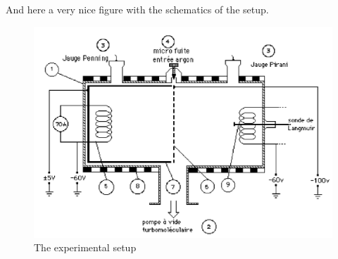 And here a very nice figure with the schematics of the setup.
\begin{figure}
    \centering
    \includegraphics[width=12cm]{figures/experimental-setup.png}
    \caption{The experimental setup}
    \label{fig:experimental_setup}
\end{figure}